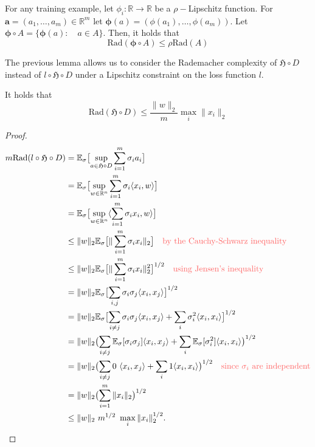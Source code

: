 \begin{lemma}
	For any training example, let $\phi_i: \mathbb{R} \to \mathbb{R}$ be a
	$\rho-$Lipschitz function. For $\mathbf{a} = (a_1, \dots, a_m) \in
	\mathbb{R}^m$ let $\mathbf{\phi}(a) = (\phi({a_1}), \dots,
	\phi(a_m))$. Let $\mathbf{\phi} \circ A = \{\mathbf{\phi}(a): \quad a \in
	A\}$. Then, it holds that
	$$ 
	\text{Rad}(\mathbf{\phi} \circ A) \leq \rho \text{Rad}(A)
	$$		
\end{lemma}
	The previous lemma allows us to consider the Rademacher complexity of
	$\mathfrak{H} \circ D$ instead of $l \circ \mathfrak{H} \circ D$ under a
	Lipschitz constraint on the loss function $l$.		
\begin{thm}
	It holds that
	$$
	\text{Rad}(\mathfrak{H} \circ D) \leq \frac{\|w\|_2}{m} \max_i \|x_i\|_2 
	$$
\end{thm}
\begin{proof}
	\begin{align*}
		m \text{Rad}(l \circ \mathfrak{H} \circ D) &= \mathbb{E}_{\sigma} \bigl[ \sup_{a \in \mathfrak{H} \circ D} \sum_{i=1}^{m} \sigma_i a_i \bigr] \\
		&= \mathbb{E}_{\sigma} \bigl[ \sup_{w \in \mathbb{R}^n} \sum_{i=1}^{m} \sigma_i \langle x_i, w \rangle \bigr] \\
		&= \mathbb{E}_{\sigma} \bigl[ \sup_{w \in \mathbb{R}^n} \langle \sum_{i=1}^{m} \sigma_i x_i, w \rangle \bigr] \\
		&\leq \|w\|_2 \mathbb{E}_{\sigma} \bigl[ \|\sum_{i=1}^{m} \sigma_i x_i\|_2 \bigr] \quad \text{\color{mildred} by the Cauchy-Schwarz inequality} \\
		&\leq \|w\|_2 \mathbb{E}_{\sigma} \bigl[ \|\sum_{i=1}^{m} \sigma_i x_i\|_2^2 \bigr]^{1/2} \quad \text{\color{mildred} using Jensen's inequality} \\
		&= \|w\|_2 \mathbb{E}_{\sigma} \bigl[ \sum_{i,j} \sigma_i \sigma_j \langle x_i, x_j \rangle \bigr]^{1/2} \\
		&= \|w\|_2 \mathbb{E}_{\sigma} \bigl[ \sum_{i \neq j} \sigma_i \sigma_j \langle x_i, x_j \rangle + \sum_{i} \sigma_i^2 \langle x_i, x_i \rangle \bigr]^{1/2} \\
		&= \|w\|_2 \bigl( \sum_{i \neq j} \mathbb{E}_{\sigma} [\sigma_i \sigma_j] \langle x_i, x_j \rangle + \sum_{i} \mathbb{E}_{\sigma} [\sigma_i^2] \langle x_i, x_i \rangle \bigr)^{1/2} \\ 
		&= \|w\|_2 \bigl( \sum_{i \neq j} 0\ \langle x_i, x_j \rangle + \sum_{i} 1 \langle x_i, x_i \rangle \bigr)^{1/2} \quad \text{\color{mildred} since $\sigma_i$ are independent} \\
		&= \|w\|_2  \bigl(\sum_{i=1}^m \|x_i\|_2\bigr)^{1/2} \\
		&\leq \|w\|_2 \ m^{1/2} \ \max_i \|x_i\|_2^{1/2}.
	\end{align*}
\end{proof}
